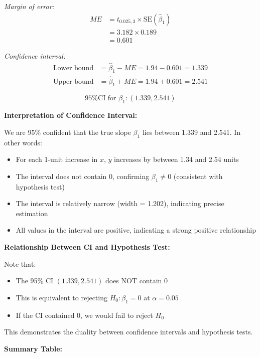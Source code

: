 \documentclass[12pt]{article}
\begin{document}
\begin{solution}
\textit{Margin of error:}
\begin{align*}
ME &= t_{0.025, 3} \times \text{SE}(\hat{\beta}_1) \\
&= 3.182 \times 0.189 \\
&= 0.601
\end{align*}

\textit{Confidence interval:}
\begin{align*}
\text{Lower bound} &= \hat{\beta}_1 - ME = 1.94 - 0.601 = 1.339 \\
\text{Upper bound} &= \hat{\beta}_1 + ME = 1.94 + 0.601 = 2.541
\end{align*}

\[
\boxed{\text{95\% CI for } \beta_1: (1.339, 2.541)}
\]

\textbf{Interpretation of Confidence Interval:}

We are 95\% confident that the true slope $\beta_1$ lies between 1.339 and 2.541. In other words:

\begin{itemize}
    \item For each 1-unit increase in $x$, $y$ increases by between 1.34 and 2.54 units
    \item The interval does not contain 0, confirming $\beta_1 \neq 0$ (consistent with hypothesis test)
    \item The interval is relatively narrow (width = 1.202), indicating precise estimation
    \item All values in the interval are positive, indicating a strong positive relationship
\end{itemize}

\textbf{Relationship Between CI and Hypothesis Test:}

Note that:
\begin{itemize}
    \item The 95\% CI $(1.339, 2.541)$ does NOT contain 0
    \item This is equivalent to rejecting $H_0: \beta_1 = 0$ at $\alpha = 0.05$
    \item If the CI contained 0, we would fail to reject $H_0$
\end{itemize}

This demonstrates the duality between confidence intervals and hypothesis tests.

\textbf{Summary Table:}


\end{solution}
\end{document}
